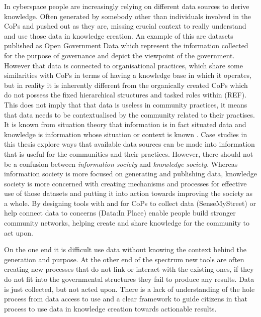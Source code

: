 In cyberspace people are increasingly relying on different data sources to derive knowledge. 
Often generated by somebody other than individuals involved in the CoPs and pushed out as they are, missing crucial context to really understand and use those data in knowledge creation. An example of this are datasets published as Open Government Data which represent the information collected for the purpose of governance and depict the viewpoint of the government. However that data is connected to organisational practices, which share some similarities with CoPs in terms of having a knowledge base in which it operates, but in reality it is inherently different from the organically created CoPs which do not possess the fixed hierarchical structures and tasked roles within (REF). This does not imply that that data is useless in community practices, it means that data needs to be contextualised by the community related to their practises. It is known from situation theory that information is in fact situated data and knowledge is information whose situation or context is known \citep{hakken_social_2003}. Case studies in this thesis explore ways that available data sources can be made into information that is useful for the communities and their practices. However, there should not be a confusion between \textit{information society} and \textit{knowledge society}. Whereas information society is more focused on generating and publishing data, knowledge society is more concerned with creating mechanisms and processes for effective use of those datasets and putting it into action towards improving the society as a whole. By designing tools with and for CoPs to collect data (SenseMyStreet) or help connect data to concerns (Data:In Place) enable people build stronger community networks, helping create and share knowledge for the community to act upon.

 On the one end it is difficult use data without knowing the context behind the generation and purpose. At the other end of the spectrum new tools are often creating new processes that do not link or interact with the existing ones, if they do not fit into the governmental structures they fail to produce any results. Data is just collected, but not acted upon. There is a lack of understanding of the hole process from data access to use and a clear framework to guide citizens in that process to use data in knowledge creation towards actionable results.

